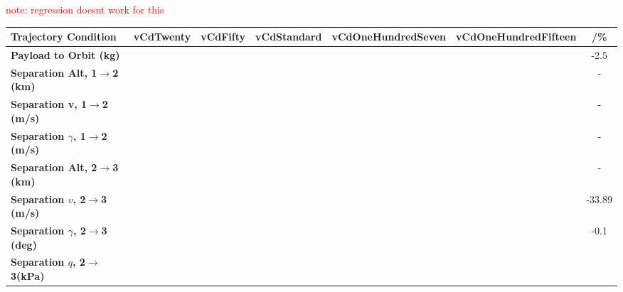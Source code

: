 \textcolor{red}{note: regression doesnt work for this} 
\begin{table}[ht]
	\centering
	\begin{tabular}{l c c c c c c} 
		\hline \textbf{Trajectory Condition}
		&vCdTwenty
		&vCdFifty
		&vCdStandard
		&vCdOneHundredSeven
		&vCdOneHundredFifteen
		& /\%
		\\
		\hline \textbf{Payload to Orbit (kg)}
		& \PayloadToOrbitvCdTwenty
		& \PayloadToOrbitvCdFifty
		& \PayloadToOrbitvCdStandard
		& \PayloadToOrbitvCdOneHundredSeven
		& \PayloadToOrbitvCdOneHundredFifteen
		&-2.5
		\\
		\textbf{Separation Alt, 1$\rightarrow$2 (km)}
		& \firstsecondSeparationAltvCdTwenty
		& \firstsecondSeparationAltvCdFifty
		& \firstsecondSeparationAltvCdStandard
		& \firstsecondSeparationAltvCdOneHundredSeven
		& \firstsecondSeparationAltvCdOneHundredFifteen
		& -
		\\
		\textbf{Separation v, 1$\rightarrow$2 (m/s)}
		& \firstsecondSeparationvvCdTwenty
		& \firstsecondSeparationvvCdFifty
		& \firstsecondSeparationvvCdStandard
		& \firstsecondSeparationvvCdOneHundredSeven
		& \firstsecondSeparationvvCdOneHundredFifteen
		& -
		\\
		\textbf{Separation $\gamma$, 1$\rightarrow$2 (m/s)}
		& \firstsecondSeparationgammavCdTwenty
		& \firstsecondSeparationgammavCdFifty
		& \firstsecondSeparationgammavCdStandard
		& \firstsecondSeparationgammavCdOneHundredSeven
		& \firstsecondSeparationgammavCdOneHundredFifteen
		& -
		\\
		\textbf{Separation Alt, 2$\rightarrow$3 (km)}
		& \secondthirdSeparationAltvCdTwenty
		& \secondthirdSeparationAltvCdFifty
		& \secondthirdSeparationAltvCdStandard
		& \secondthirdSeparationAltvCdOneHundredSeven
		& \secondthirdSeparationAltvCdOneHundredFifteen
		& -
		\\
		\textbf{Separation $v$, 2$\rightarrow$3 (m/s)}
		& \secondthirdSeparationvvCdTwenty
		& \secondthirdSeparationvvCdFifty
		& \secondthirdSeparationvvCdStandard
		& \secondthirdSeparationvvCdOneHundredSeven
		& \secondthirdSeparationvvCdOneHundredFifteen
		&-33.89
		\\
		\textbf{Separation $\gamma$, 2$\rightarrow$3 (deg)}
		& \secondthirdSeparationgammavCdTwenty
		& \secondthirdSeparationgammavCdFifty
		& \secondthirdSeparationgammavCdStandard
		& \secondthirdSeparationgammavCdOneHundredSeven
		& \secondthirdSeparationgammavCdOneHundredFifteen
		&-0.1
		\\
		\textbf{Separation $q$, 2$\rightarrow$3(kPa)}
		& \secondthirdSeparationqvCdTwenty

\end{tabular}
\end{table}
